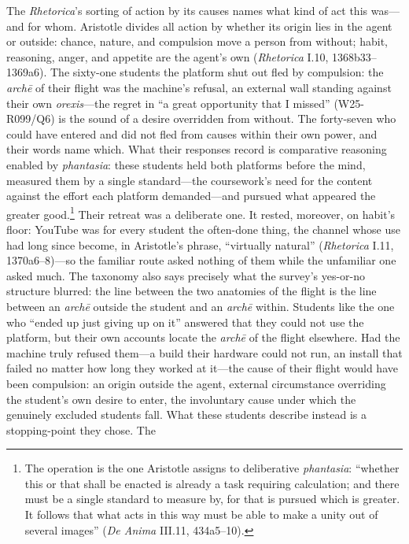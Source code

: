 The \textit{Rhetorica}'s sorting of action by its causes names what kind of
act this was---and for whom. Aristotle divides all action by whether its
origin lies in the agent or outside: chance, nature, and compulsion move a
person from without; habit, reasoning, anger, and appetite are the agent's
own (\textit{Rhetorica} I.10, 1368b33--1369a6). The sixty-one students the
platform shut out fled by compulsion: the \textit{arch\=e} of their flight
was the machine's refusal, an external wall standing against their own
\textit{orexis}---the regret in ``a great opportunity that I missed''
(W25-R099/Q6) is the sound of a desire overridden from without. The
forty-seven who could have entered and did not fled from causes within
their own power, and their words name which. What their responses record is
comparative reasoning enabled by \textit{phantasia}: these students held
both platforms before the mind, measured them by a single standard---the
coursework's need for the content against the effort each platform
demanded---and pursued what appeared the greater good.\footnote{The
operation is the one Aristotle assigns to deliberative \textit{phantasia}:
``whether this or that shall be enacted is already a task requiring
calculation; and there must be a single standard to measure by, for that is
pursued which is greater. It follows that what acts in this way must be
able to make a unity out of several images'' (\textit{De Anima} III.11,
434a5--10).} Their retreat was a deliberate one. It rested, moreover,
on habit's floor: YouTube was for every student the
often-done thing, the channel whose use had long since become, in
Aristotle's phrase, ``virtually natural'' (\textit{Rhetorica} I.11,
1370a6--8)---so the familiar route asked nothing of them while the
unfamiliar one asked much. The taxonomy also says precisely what the
survey's yes-or-no structure blurred: the line between the two anatomies of
the flight is the line between an \textit{arch\=e} outside the student and
an \textit{arch\=e} within. Students like the one who ``ended up just
giving up on it'' answered that they could not use the platform, but their
own accounts locate the \textit{arch\=e} of the flight elsewhere. Had the
machine truly refused them---a build their hardware could not run, an
install that failed no matter how long they worked at it---the cause of
their flight would have been compulsion: an origin outside the agent,
external circumstance overriding the student's own desire to enter, the
involuntary cause under which the genuinely excluded students fall. What
these students describe instead is a stopping-point they chose. The
